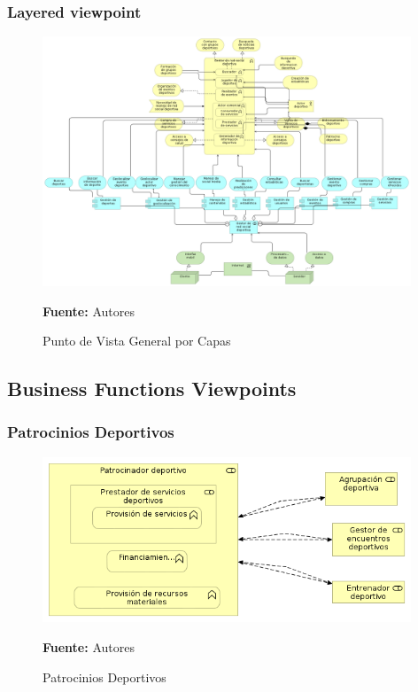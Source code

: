 \subsubsection{Layered viewpoint}

\begin{figure}[!htb]
  \begin{center}
    \includegraphics[width=11cm]{./imagenes/generallayered.png}
    \caption{Punto de Vista General por Capas}
    \label{fig:general_layered}
    \textbf{Fuente:}  Autores
  \end{center}
\end{figure}

\subsection{Business Functions Viewpoints}

\subsubsection{Patrocinios Deportivos}

\begin{figure}[!htb]
  \begin{center}
    \includegraphics[width=11cm]{./imagenes/business_functions/patrociniosdeportivos.png}
    \caption{Patrocinios Deportivos}
    \label{fig:patrocinios_deportivos}
    \textbf{Fuente:}  Autores
  \end{center}
\end{figure}

